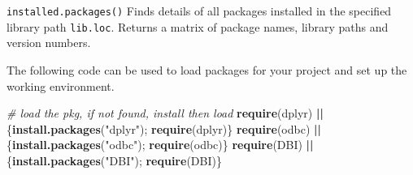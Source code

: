 \documentclass[
]{book}
\newenvironment{Shaded}{\begin{snugshade}}{\end{snugshade}}
\newcommand{\CommentTok}[1]{\textcolor[rgb]{0.56,0.35,0.01}{\textit{#1}}}
\newcommand{\DecValTok}[1]{\textcolor[rgb]{0.00,0.00,0.81}{#1}}
\newcommand{\ErrorTok}[1]{\textcolor[rgb]{0.64,0.00,0.00}{\textbf{#1}}}
\newcommand{\FunctionTok}[1]{\textcolor[rgb]{0.13,0.29,0.53}{\textbf{#1}}}
\newcommand{\NormalTok}[1]{#1}
\newcommand{\OtherTok}[1]{\textcolor[rgb]{0.56,0.35,0.01}{#1}}
\newcommand{\SpecialCharTok}[1]{\textcolor[rgb]{0.81,0.36,0.00}{\textbf{#1}}}
\newcommand{\StringTok}[1]{\textcolor[rgb]{0.31,0.60,0.02}{#1}}
\begin{document}
\texttt{installed.packages()} Finds details of all packages installed in the specified library path \texttt{lib.loc}. Returns a matrix of package names, library paths and version numbers.

\begin{Shaded}
\end{Shaded}

The following code can be used to load packages for your project and set up the working environment.

\begin{Shaded}
\begin{Highlighting}[]
\CommentTok{\# load the pkg, if not found, install then load}
\FunctionTok{require}\NormalTok{(dplyr) }\SpecialCharTok{||}\NormalTok{ \{}\FunctionTok{install.packages}\NormalTok{(}\StringTok{"dplyr"}\NormalTok{); }\FunctionTok{require}\NormalTok{(dplyr)\}}
\FunctionTok{require}\NormalTok{(odbc) }\SpecialCharTok{||}\NormalTok{ \{}\FunctionTok{install.packages}\NormalTok{(}\StringTok{"odbc"}\NormalTok{); }\FunctionTok{require}\NormalTok{(odbc)\}}
\FunctionTok{require}\NormalTok{(DBI) }\SpecialCharTok{||}\NormalTok{ \{}\FunctionTok{install.packages}\NormalTok{(}\StringTok{"DBI"}\NormalTok{); }\FunctionTok{require}\NormalTok{(DBI)\}}
\end{Highlighting}
\end{Shaded}
\end{document}
